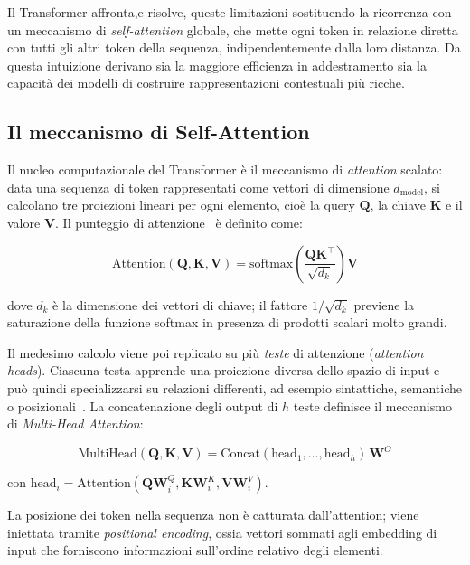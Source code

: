 Il Transformer affronta,e risolve, queste limitazioni sostituendo la ricorrenza con un meccanismo
di \textit{self-attention} globale, che mette ogni token in relazione diretta
con tutti gli altri token della sequenza, indipendentemente dalla loro distanza. 
Da questa intuizione derivano sia la maggiore efficienza in
addestramento sia la capacità dei modelli di costruire
rappresentazioni contestuali più ricche.

\subsection{Il meccanismo di Self-Attention}
\label{subsec:attention}

Il nucleo computazionale del Transformer è il meccanismo di \textit{attention}
scalato: data una sequenza di token rappresentati come vettori di dimensione
$d_{\text{model}}$, si calcolano tre proiezioni lineari per ogni elemento, cioè
la query $\mathbf{Q}$, la chiave $\mathbf{K}$ e il valore $\mathbf{V}$. Il
punteggio di attenzione~\cite{vaswani2017attention} è definito come:

\begin{equation}
  \text{Attention}(\mathbf{Q}, \mathbf{K}, \mathbf{V})
  = \text{softmax}\!\left(\frac{\mathbf{Q}\mathbf{K}^\top}{\sqrt{d_k}}\right)\mathbf{V}
  \label{eq:attention}
\end{equation}

dove $d_k$ è la dimensione dei vettori di chiave; il fattore $1/\sqrt{d_k}$
previene la saturazione della funzione softmax in presenza di prodotti scalari
molto grandi.

Il medesimo calcolo viene poi replicato su più \textit{teste} di attenzione
(\textit{attention heads}). Ciascuna testa apprende una proiezione diversa dello
spazio di input e può quindi specializzarsi su relazioni differenti, ad esempio
sintattiche, semantiche o posizionali~\cite{vaswani2017attention}. La
concatenazione degli output di $h$ teste definisce il meccanismo di
\textit{Multi-Head Attention}:

\begin{equation}
  \text{MultiHead}(\mathbf{Q}, \mathbf{K}, \mathbf{V})
  = \text{Concat}(\text{head}_1, \ldots, \text{head}_h)\,\mathbf{W}^O
  \label{eq:multihead}
\end{equation}

con $\text{head}_i = \text{Attention}(\mathbf{Q}\mathbf{W}^Q_i,
\mathbf{K}\mathbf{W}^K_i, \mathbf{V}\mathbf{W}^V_i)$.

La posizione dei token nella sequenza non è catturata dall'attention; viene
iniettata tramite \textit{positional encoding}, ossia vettori sommati agli embedding
di input che forniscono informazioni sull'ordine relativo degli elementi.

